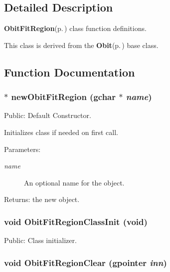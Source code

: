 \subsection{Detailed Description}
{\bf Obit\-Fit\-Region}{\rm (p.\,\pageref{structObitFitRegion})} class function definitions. 

This class is derived from the {\bf Obit}{\rm (p.\,\pageref{structObit})} base class.

\subsection{Function Documentation}
\subsubsection{$\ast$ new\-Obit\-Fit\-Region (gchar $\ast$ {\em name})}\label{ObitFitRegion_8c_a6}


Public: Default Constructor. 

Initializes class if needed on first call. \begin{Desc}
\item[Parameters:]
\begin{description}
\item[{\em name}]An optional name for the object. \end{description}
\end{Desc}
\begin{Desc}
\item[Returns:]the new object. \end{Desc}
\subsubsection{\setlength{\rightskip}{0pt plus 5cm}void Obit\-Fit\-Region\-Class\-Init (void)}\label{ObitFitRegion_8c_a14}


Public: Class initializer. 

\subsubsection{\setlength{\rightskip}{0pt plus 5cm}void Obit\-Fit\-Region\-Clear (gpointer {\em inn})}\label{ObitFitRegion_8c_a4}


